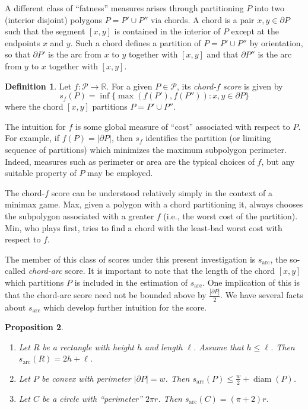 \documentclass[]{jocg}
\newcommand{\RR}{\mathbb{R}}
\newcommand{\set}[1]{\{#1\}}
\newcommand{\abs}[1]{|#1|}
\newcommand{\chordarc}{{s_{\textrm{arc}}}}
\DeclareMathOperator{\diam}{\mathrm{diam}}
\newtheorem{proposition}{Proposition}[section]
\theoremstyle{definition}
\newtheorem{definition}[proposition]{Definition}
\theoremstyle{remark}
\begin{document}
A different class of ``fatness'' measures arises through partitioning $P$ into
two (interior disjoint) polygons $P = P' \cup P''$ via chords. A chord is a pair
$x,y \in \partial P$ such that the segment $[x,y]$ is contained in the interior
of $P$ except at the endpoints $x$ and $y$. Such a chord defines a partition of
$P = P' \cup P''$ by orientation, so that $\partial P'$ is the arc from $x$ to
$y$ together with $[x,y]$ and that $\partial P''$ is the arc from $y$ to $x$
together with $[x,y]$.

\begin{definition}
  Let $f : \mathcal{P} \to \RR$. For a given $P \in \mathcal{P}$, its
  \emph{chord-$f$ score} is given by
  \begin{equation*}
    s_f (P) = \inf \set{\max(f(P'), f(P'')) : x, y \in \partial P}
  \end{equation*}
  where the chord $[x,y]$ partitions $P = P' \cup P''$.
  \label{def:chord-f}
\end{definition}

The intuition for $f$ is some global measure of ``cost'' associated with respect
to $P$. For example, if $f(P) = \abs{\partial P}$, then $s_f$ identifies the
partition (or limiting sequence of partitions) which minimizes the maximum
subpolygon perimeter. Indeed, measures such as perimeter or area are the typical
choices of $f$, but any suitable property of $P$  may be employed. 

The chord-$f$ score can be understood relatively simply in the context of a
minimax game. Max, given a polygon with a chord partitioning it, always chooses
the subpolygon associated with a greater $f$ (i.e., the worst cost of the
partition). Min, who plays first, tries to find a chord with the least-bad worst
cost with respect to $f$.

The member of this class of scores under this present investigation is
$\chordarc$, the so-called \emph{chord-arc} score. It is important to note that
the length of the chord $[x,y]$ which partitions $P$ is included in the
estimation of $\chordarc$. One implication of this is that the chord-arc score
need not be bounded above by $\frac{\abs{\partial P}}{2}$.  We have several
facts about $\chordarc$ which develop further intuition for the score.
\begin{proposition}
  \begin{enumerate}
    \item Let $R$ be a rectangle with height $h$ and length $\ell$. Assume that
      $h \leq \ell$. Then $\chordarc(R) = 2h + \ell$.
    \item Let $P$ be convex with perimeter $\abs{\partial P} = w$. Then
      $\chordarc(P) \leq \frac{w}{2} + \diam (P)$.
    \item Let $C$ be a circle with ``perimeter'' $2\pi r$. Then $\chordarc(C) =
      (\pi + 2)r$.
  \end{enumerate}
  \label{rem:chordarc}
\end{proposition}
\end{document}

